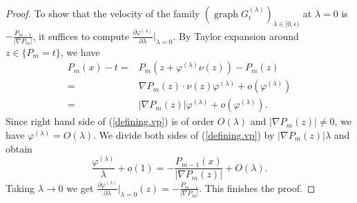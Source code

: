 \documentclass[10pt,a4paper]{amsart}
\DeclareMathOperator{\graph}{graph}
\newcommand{\vp}{\varphi}
\begin{document}
\begin{proof}
To show that the velocity of the family $(\graph G_t^{(\lambda)})_{\lambda\in [0,\epsilon)}$ at $\lambda=0$ is $-\frac{P_{m-1}}{|\nabla P_m|}$, it suffices to compute $\frac{\partial \vp^{(\lambda)}}{\partial \lambda}|_{\lambda=0}$. By Taylor expansion around $z\in \{P_m=t\}$, we have
\[\begin{aligned}
	P_m(x)-t=&P_m(z+\vp^{(\lambda)}\nu(z))-P_m(z)\\
	=&\nabla P_m(z)\cdot\nu(z)\vp^{(\lambda)}+o(\vp^{(\lambda)})\\
	=&|\nabla P_m(z)|\vp^{(\lambda)}+o(\vp^{(\lambda)}).
\end{aligned}\]
Since right hand side of (\ref{defining.vp}) is of order $O(\lambda)$ and $|\nabla P_m(z)|\neq0$, we have $\vp^{(\lambda)}=O(\lambda)$.
We divide both sides of (\ref{defining.vp}) by $|\nabla P_m(z)|\lambda$ and obtain
\[\frac{\vp^{(\lambda)}}{\lambda}+o(1)=-\frac{P_{m-1}(x)}{|\nabla P_m(z)|}+O(\lambda).\]
Taking $\lambda\to0$ we get $\frac{\partial \vp^{(\lambda)}}{\partial \lambda}|_{\lambda=0}(z)=-\frac{P_{m-1}}{|\nabla P_m|}$. This finishes the proof.
\end{proof}
\end{document}
